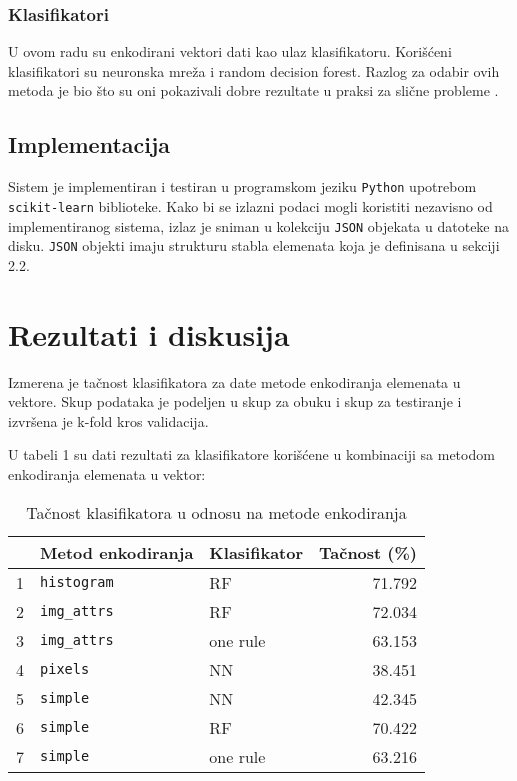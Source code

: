\documentclass[]{amsart}
\begin{document}
\subsubsection{Klasifikatori}
\label{sec:org0ef63da}

U ovom radu su enkodirani vektori dati kao ulaz klasifikatoru. Korišćeni klasifikatori su neuronska mreža i random decision forest. Razlog za
odabir ovih metoda je bio što su oni pokazivali dobre rezultate u praksi za slične probleme \cite{bitew2018logical} \cite{he2017extracting}.

\subsection{Implementacija}
\label{sec:orgf94d64a}

Sistem je implementiran i testiran u programskom jeziku \texttt{Python} upotrebom \texttt{scikit-learn} biblioteke. Kako bi se izlazni podaci mogli koristiti nezavisno od
implementiranog sistema, izlaz je sniman u kolekciju \texttt{JSON} objekata u datoteke na disku. \texttt{JSON} objekti imaju strukturu stabla elemenata koja je definisana u
sekciji 2.2.

\section{Rezultati i diskusija}
\label{sec:orga78d38e}


Izmerena je tačnost klasifikatora za date metode enkodiranja elemenata u vektore. Skup podataka je podeljen u skup za obuku i skup za testiranje
i izvršena je k-fold kros validacija. 

U tabeli 1 su dati rezultati za klasifikatore korišćene u kombinaciji sa metodom enkodiranja elemenata u vektor:


\begin{table}
\begin{tabular}{rllr}
 & Metod enkodiranja & Klasifikator & Tačnost (\%)\\
\hline
1 & \texttt{histogram} & RF & 71.792\\
2 & \texttt{img\_attrs} & RF & 72.034\\
3 & \texttt{img\_attrs} & one rule & 63.153\\
4 & \texttt{pixels} & NN & 38.451\\
5 & \texttt{simple} & NN & 42.345\\
6 & \texttt{simple} & RF & 70.422\\
7 & \texttt{simple} & one rule & 63.216\\
\end{tabular}
\caption{Tačnost klasifikatora u odnosu na metode enkodiranja}
\end{table}
\end{document}
